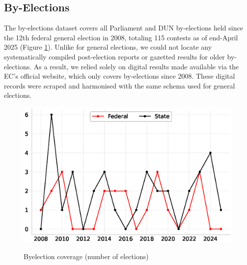 \documentclass[11pt]{article}
\begin{document}
\begin{figure}[htbp]
\end{figure}

\subsection*{By-Elections}

The by-elections dataset covers all Parliament and DUN by-elections held since the 12th federal general election in 2008, totaling 115 contests as of end-April 2025 (Figure \ref{fig:by_coverage}). Unlike for general elections, we could not locate any systematically compiled post-election reports or gazetted results for older by-elections. As a result, we relied solely on digital results made available via the EC's official website, which only covers by-elections since 2008. These digital records were scraped and harmonised with the same schema used for general elections.

\begin{figure}[htbp]
	\centering
	\caption{Byelection coverage (number of elections)}
	\vspace{0.14in}
	\includegraphics[width=0.8\linewidth]{dataviz/timeseries_byelections.eps}
	\label{fig:by_coverage}
\end{figure}
\end{document}
